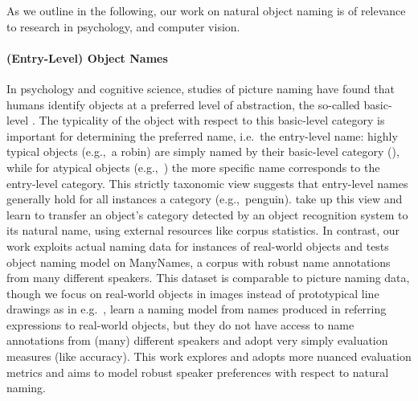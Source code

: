 

As we outline in the following, our work on natural object naming is of relevance to research in psychology, \langvis and computer vision. 

\paragraph{(Entry-Level) Object Names}

%

In psychology and cognitive science, studies of picture naming have found that humans identify objects at a preferred level of abstraction, the so-called basic-level \cite{rosch1976basic,jolicoeur1984pictures}. 
The typicality of the object with respect to this basic-level category is important for determining the preferred name, i.e.\ the entry-level name: highly typical objects (e.g.,\ a robin) are simply named by their basic-level category (), while for atypical objects  (e.g.,\ ) the more specific name corresponds to the entry-level category. 
This strictly taxonomic view suggests that entry-level names generally hold for all instances a category (e.g.,\ penguin). 
 take up this view and learn to transfer an object's category detected by an object recognition system to its natural name, using external resources like corpus statistics. 
In contrast, our work exploits actual naming data for instances of real-world objects and tests object naming model on ManyNames, a corpus with robust name annotations from many different speakers.
This dataset is comparable to picture naming data, though we focus on real-world objects in images instead of prototypical line drawings as in e.g.\ \cite{rossion2004revisiting}, 
  learn a naming model from names produced in referring expressions to real-world objects, but they do not have access to name annotations from (many) different speakers and adopt very simply evaluation measures (like accuracy). 
 This work explores and adopts more nuanced evaluation metrics and aims to model robust speaker preferences with respect to natural naming.
 
